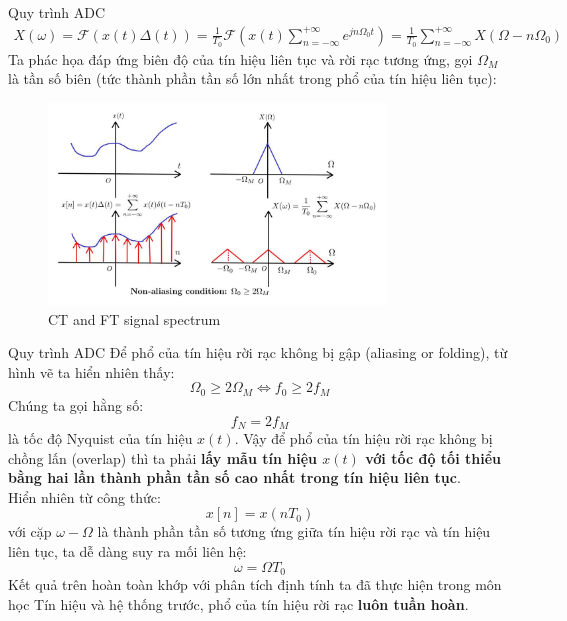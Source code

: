 \documentclass[8pt]{beamer}
\begin{document}
\begin{frame}{Quy trình ADC}
\begin{equation*}
\begin{split}
	X(\omega)=\mathscr{F}(x(t)\Delta(t))=\frac{1}{T_{0}}\mathscr{F}\left(x(t)\sum_{n=-\infty}^{+\infty}e^{jn\Omega_{0}t}\right)=\frac{1}{T_{0}}\sum_{n=-\infty}^{+\infty}X(\Omega-n\Omega_{0})
\end{split}
\end{equation*}
Ta phác họa đáp ứng biên độ của tín hiệu liên tục và rời rạc tương ứng, gọi $\Omega_{M}$ là tần số biên (tức thành phần tần số lớn nhất trong phổ của tín hiệu liên tục):
\begin{figure}[h]
			\includegraphics[width=0.8\textwidth]{4.jpg}
			\caption{CT and FT signal spectrum}			\label{fig:re5}
		\end{figure}

\end{frame}
\begin{frame}{Quy trình ADC}
	Để phổ của tín hiệu rời rạc không bị gập (aliasing or folding), từ hình vẽ ta hiển nhiên thấy: $$\Omega_{0}\geq2\Omega_{M}\Leftrightarrow f_{0}\geq 2f_{M}$$
	Chúng ta gọi hằng số: $$f_{N}=2f_{M}$$  là \alert{tốc độ Nyquist} của tín hiệu $x(t)$. Vậy để phổ của tín hiệu rời rạc không bị chồng lấn (overlap) thì ta phải \textbf{lấy mẫu tín hiệu $x(t)$ với \alert{tốc độ} tối thiểu bằng hai lần thành phần tần số cao nhất trong tín hiệu liên tục}.
	\\ Hiển nhiên từ công thức: $$x[n]=x(nT_{0})$$ với cặp $\omega-\Omega$ là thành phần tần số tương ứng giữa tín hiệu rời rạc và tín hiệu liên tục, ta dễ dàng suy ra mối liên hệ: $$\omega=\Omega T_{0}$$
	Kết quả trên hoàn toàn khớp với phân tích định tính ta đã thực hiện trong môn học \alert{Tín hiệu và hệ thống} trước, phổ của tín hiệu rời rạc \textbf{luôn tuần hoàn}.
\end{frame}
\end{document}
